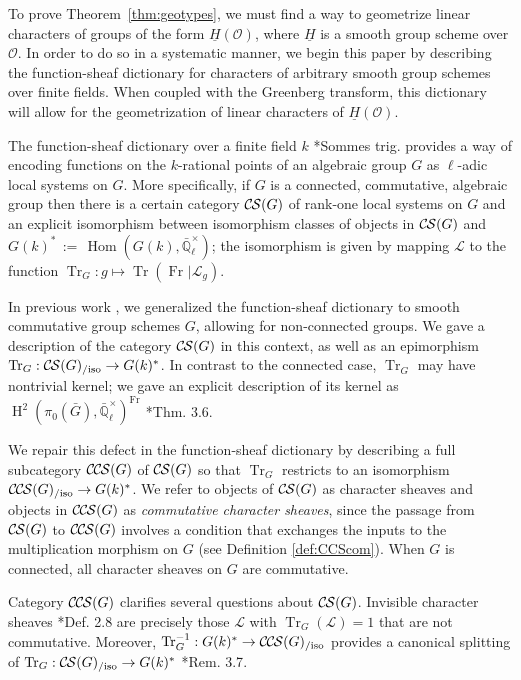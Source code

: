 \documentclass[10pt]{amsart}
\theoremstyle{plain}
\theoremstyle{definition}
\newcommand{\EE}{\mathbb{\bar Q}_\ell}
\newcommand{\EEx}{\EE^\times}
\newcommand{\Frob}[1]{\operatorname{Fr}_{#1}}
\DeclareMathOperator{\Hom}{Hom}
\DeclareMathOperator{\Hh}{H}
\newcommand{\ceq}{{\, :=\, }}
\DeclareMathOperator{\Tr}{Tr}
\newcommand{\TrFrob}[1]{\Tr_{#1}}
\newcommand{\cs}[1]{{\mathcal{#1}}}
\newcommand{\CS}{{\mathcal{C\hskip-0.8pt S}}}
\newcommand{\CCS}{{\mathcal{C\hskip-.8pt C\hskip-0.8pt S}}}
\newcommand{\CSiso}[1]{\CS(#1)_{/\text{iso}}}
\newcommand{\CCSiso}[1]{\CCS(#1)_{/\text{iso}}}
\newcommand{\bG}{\bar{G}}
\renewcommand{\O}{{\mathcal{O}}}
\begin{document}
To prove Theorem~\ref{thm:geotypes}, we must find a way to geometrize linear characters of groups of the form $\underline{H}(\O)$, where $\underline{H}$ is a smooth group scheme over $\O$. 
In order to do so in a systematic manner, we begin this paper by describing the function-sheaf dictionary for characters of arbitrary smooth group schemes over finite fields. 
When coupled with the Greenberg transform, this dictionary will allow for the geometrization of linear characters of $\underline{H}(\O)$.

The function-sheaf dictionary over a finite field $k$ \cite{deligne:SGA4.5}*{Sommes trig.}
provides a way of encoding functions on the $k$-rational points of an algebraic group $G$
as $\ell$-adic local systems on $G$.  More specifically, if $G$ is a connected, commutative, algebraic group
then there is a certain category $\CS(G)$ of rank-one local systems on $G$ and an
explicit isomorphism between isomorphism classes
of objects in $\CS(G)$ and $G(k)^* \ceq \Hom(G(k), \EEx)$; 
the isomorphism is given by mapping $\cs{L}$ to the function
$\TrFrob{G} : g \mapsto \Tr(\Frob{} \vert \cs{L}_g)$.

In previous work \cite{cunningham-roe:13a}, we generalized the function-sheaf dictionary to
smooth commutative group schemes $G$, allowing for non-connected groups.
We gave a description of the category $\CS(G)$ in this context, as well
as an epimorphism $\TrFrob{G} : \CSiso{G} \to G(k)^*$.
In contrast to the connected case, $\TrFrob{G}$ may have nontrivial kernel;
we gave an explicit description of its kernel as $\Hh^2(\pi_0(\bG), \EEx)^{\Frob{}}$ \cite{cunningham-roe:13a}*{Thm. 3.6}.  

We repair this defect in the function-sheaf dictionary
 by describing a full subcategory $\CCS(G)$ of $\CS(G)$ so that $\TrFrob{G}$ restricts to an isomorphism $\CCSiso{G} \to G(k)^*$.
We refer to objects of $\CS(G)$ as character sheaves and objects in $\CCS(G)$ as \emph{commutative character sheaves}, since the passage from $\CS(G)$ to $\CCS(G)$ involves a condition that exchanges the inputs to the multiplication morphism on $G$ (see Definition \ref{def:CCScom}).  
When $G$ is connected, all character sheaves on $G$ are commutative.

Category $\CCS(G)$ clarifies several questions about $\CS(G)$. 
Invisible character sheaves \cite{cunningham-roe:13a}*{Def. 2.8} are precisely those $\cs{L}$ with $\TrFrob{G}(\cs{L}) = 1$ that are not commutative.  Moreover, $\TrFrob{G}^{-1} : G(k)^* \to \CCSiso{G}$ provides a canonical splitting of $\TrFrob{G} : \CSiso{G} \to G(k)^*$ \cite{cunningham-roe:13a}*{Rem. 3.7}.
\end{document}
